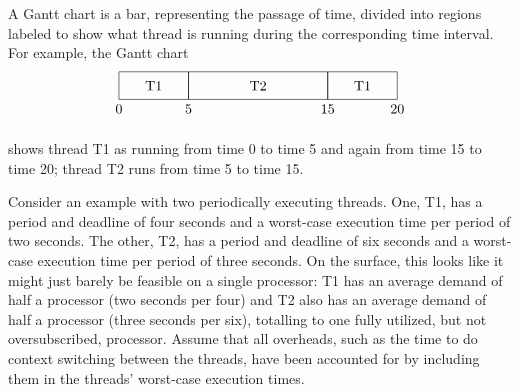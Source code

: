 A Gantt chart is a bar, representing the passage of time, divided into
regions labeled to show what thread is running during the
corresponding time interval.  For example, the Gantt chart
\[\begin{tikzpicture}[scale=.035]
\draw (0,0) rectangle (50,20);
\draw (50,0) rectangle (150,20);
\draw (150,0) rectangle (200,20);
\draw (25,10) node{T1};
\draw (100,10) node{T2};
\draw (175,10) node{T1};
\draw (0,-7) node{0};
\draw (50,-7) node{5};
\draw (150,-7) node{15};
\draw (200,-7) node{20};
\end{tikzpicture}\]

shows thread T1 as running from time 0 to time 5 and again from time
15 to time 20; thread T2 runs from time 5 to time 15.

Consider an example with two periodically executing threads.
One, T1, has a period and deadline of four seconds and a worst-case
execution time per period of two seconds.  The other, T2, has a period
and deadline of six seconds and a worst-case execution time per
period of three seconds.  On the surface, this looks like it might
just barely be feasible on a single processor: T1 has an average
demand of half a processor (two seconds per four) and T2 also has an
average demand of half a processor (three seconds per six), totalling
to one fully utilized, but not oversubscribed, processor.  Assume
that all overheads, such as the time to do context switching between
the threads, have been accounted for by including them in the threads'
worst-case execution times.

